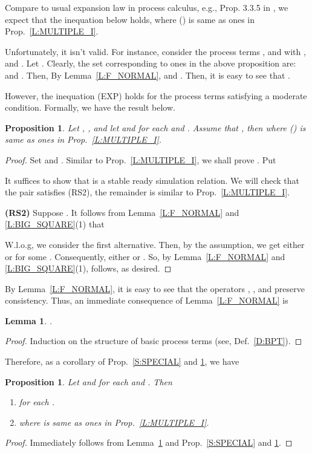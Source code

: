 \documentclass{elsarticle}
\theoremstyle{plain}
\newtheorem{lemma}[theorem]{Lemma}
\newtheorem{proposition}[theorem]{Proposition}
\theoremstyle{definition}
\begin{document}
Compare to usual expansion law in process calculus, e.g., Prop. 3.3.5 in \cite{Milner89}, we expect that the inequation below holds, where  () is same as ones in Prop.~\ref{L:MULTIPLE_I}.

Unfortunately, it isn't valid.
For instance, consider the process terms ,  and  with ,  and .
Let .
Clearly, the set  corresponding to ones in the above proposition are:  and .
Then, 
By Lemma~\ref{L:F_NORMAL},  and  .
Then, it is easy to see that .

However, the inequation (EXP) holds for the process terms satisfying a moderate condition. Formally, we have the result below.

\begin{proposition}\label{L:MULTIPLE_IV}
Let , , and let  and
 for each  and .
Assume that ,
 then 
where  () is same as ones in Prop.~\ref{L:MULTIPLE_I}.
\end{proposition}
\begin{proof}
  Set  and .
  Similar to Prop.~\ref{L:MULTIPLE_I}, we shall prove . Put
  
  It suffices to show that  is a stable ready simulation relation. We will check that the pair  satisfies (RS2), the remainder is similar to Prop.~\ref{L:MULTIPLE_I}.

  \textbf{(RS2)} Suppose . It follows from Lemma~\ref{L:F_NORMAL} and \ref{L:BIG_SQUARE}(1) that
  
  W.l.o.g, we consider the first alternative.
  Then, by the assumption, we get either  or  for some .
  Consequently, either  or .
  So, by Lemma~\ref{L:F_NORMAL} and \ref{L:BIG_SQUARE}(1),  follows, as desired.
\end{proof}



By Lemma~\ref{L:F_NORMAL}, it is easy to see that the operators , ,  and  preserve consistency. Thus, an immediate consequence of Lemma~\ref{L:F_NORMAL} is

\begin{lemma}\label{L:BPT}
  .
\end{lemma}
\begin{proof}
  Induction on the structure of basic process terms (see, Def.~\ref{D:BPT}).
\end{proof}

Therefore, as a corollary of Prop.~\ref{S:SPECIAL} and \ref{L:MULTIPLE_IV}, we have

\begin{proposition}\label{L:MULTIPLE_V}
Let  and  for each  and . Then
  \begin{enumerate}
    \item  for each .
    \item 
        where  is same as ones in Prop.~\ref{L:MULTIPLE_I}.
  \end{enumerate}
\end{proposition}
\begin{proof}
    Immediately follows from Lemma~\ref{L:BPT} and Prop.~\ref{S:SPECIAL} and \ref{L:MULTIPLE_IV}.
\end{proof}
\end{document}
